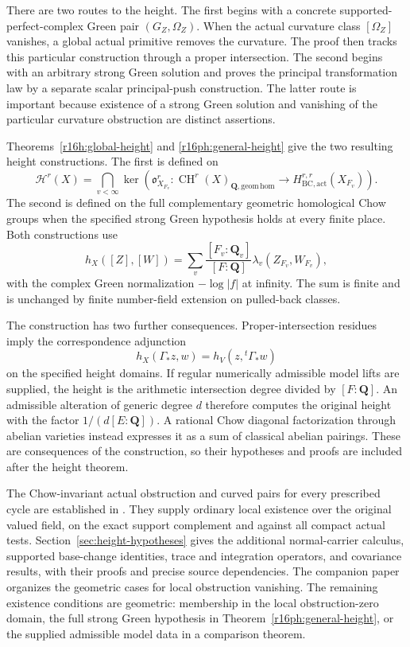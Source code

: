 \documentclass[11pt,a4paper]{article}
\theoremstyle{definition}
\theoremstyle{remark}
\numberwithin{equation}{section}
\newcommand{\CH}{\operatorname{CH}}
\begin{document}
There are two routes to the height. The first begins with a concrete supported-perfect-complex Green pair $(G_Z,\Omega_Z)$. When the actual curvature class $[\Omega_Z]$ vanishes, a global actual primitive removes the curvature. The proof then tracks this particular construction through a proper intersection. The second begins with an arbitrary strong Green solution and proves the principal transformation law by a separate scalar principal-push construction. The latter route is important because existence of a strong Green solution and vanishing of the particular curvature obstruction are distinct assertions.

Theorems~\ref{r16h:global-height} and \ref{r16ph:general-height} give the two resulting height constructions. The first is defined on
\[
 \mathcal H^r(X)=\bigcap_{v<\infty}
 \ker\!\left(\mathfrak o_{X_{F_v}}^r:
 \CH^r(X)_{\mathbf Q,\mathrm{geom\,hom}}
 \longrightarrow H_{\mathrm{BC,act}}^{r,r}(X_{F_v})\right).
\]
The second is defined on the full complementary geometric homological Chow groups when the specified strong Green hypothesis holds at every finite place. Both constructions use
\[
 h_X([Z],[W])=\sum_v\frac{[F_v:\mathbf Q_v]}{[F:\mathbf Q]}
                    \lambda_v(Z_{F_v},W_{F_v}),
\]
with the complex Green normalization $-\log|f|$ at infinity. The sum is finite and is unchanged by finite number-field extension on pulled-back classes.

The construction has two further consequences. Proper-intersection residues imply the correspondence adjunction
\[
 h_X(\Gamma_*z,w)=h_V(z,{}^t\Gamma_*w)
\]
on the specified height domains. If regular numerically admissible model lifts are supplied, the height is the arithmetic intersection degree divided by $[F:\mathbf Q]$. An admissible alteration of generic degree $d$ therefore computes the original height with the factor $1/(d[E:\mathbf Q])$. A rational Chow diagonal factorization through abelian varieties instead expresses it as a sum of classical abelian pairings. These are consequences of the construction, so their hypotheses and proofs are included after the height theorem.

The Chow-invariant actual obstruction and curved pairs for every prescribed cycle are established in \cite[Theorem 1.1]{ChowGreenPairs}. They supply ordinary local existence over the original valued field, on the exact support complement and against all compact actual tests. Section~\ref{sec:height-hypotheses} gives the additional normal-carrier calculus, supported base-change identities, trace and integration operators, and covariance results, with their proofs and precise source dependencies. The companion paper \cite{SC} organizes the geometric cases for local obstruction vanishing. The remaining existence conditions are geometric: membership in the local obstruction-zero domain, the full strong Green hypothesis in Theorem~\ref{r16ph:general-height}, or the supplied admissible model data in a comparison theorem.
\end{document}
